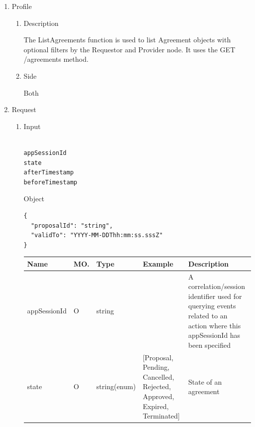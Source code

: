 \begin{enumerate}

\item Profile

\begin{enumerate}

\item Description

The ListAgreements function is used to list Agreement objects with optional filters by the Requestor and Provider node. 
It uses the GET /agreements method.

\item Side

Both

\end{enumerate}

\item Request

\begin{enumerate}

\item Input

\begin{tcolorbox}[boxrule=0pt, frame empty]
\begin{verbatim}

appSessionId
state
afterTimestamp
beforeTimestamp

\end{verbatim}
\end{tcolorbox}

Object
\begin{tcolorbox}[boxrule=0pt, frame empty]
\begin{verbatim}
{
  "proposalId": "string",
  "validTo": "YYYY-MM-DDThh:mm:ss.sssZ"
}
\end{verbatim}
\end{tcolorbox}

\begin{center}
\begin{tabular}{|p{3cm}|l|p{3cm}|p{3cm}|p{4cm}|} 
\hline
\rowcolor{lightgray}	Name	& MO.	& Type	& Example & 	Description \\
\hline

appSessionId	& O & 	string				&			& A correlation/session identifier used for querying events related to an action where this appSessionId has been specified \\
\hline

state			& O	& 	string(enum)		&	[Proposal, Pending, Cancelled, Rejected, Approved, Expired, Terminated]	&	State of an agreement \\ 
\hline


\end{tabular}
\end{center}
\end{enumerate}
\end{enumerate}

